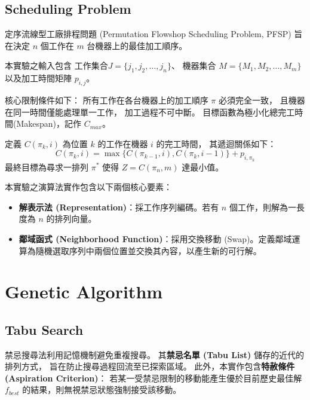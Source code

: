 \documentclass[conference]{IEEEtran}
\begin{document}
\subsection{Scheduling Problem}
定序流線型工廠排程問題 (Permutation Flowshop Scheduling Problem, PFSP)
旨在決定 $n$ 個工作在 $m$ 台機器上的最佳加工順序。

本實驗之輸入包含
工作集合$J = \{j_1, j_2, \dots, j_n\}$、
機器集合 $M = \{M_1, M_2, \dots, M_m\}$
以及加工時間矩陣 $p_{i,j}$。

核心限制條件如下：
所有工作在各台機器上的加工順序 $\pi$ 必須完全一致，
且機器在同一時間僅能處理單一工作，
加工過程不可中斷。
目標函數為極小化總完工時間(Makespan)，記作 $C_{max}$。

定義 $C(\pi_k, i)$ 為位置 $k$ 的工作在機器 $i$ 的完工時間，
其遞迴關係如下：
\begin{equation}
    C(\pi_k, i) = \max\{C(\pi_{k-1}, i), C(\pi_k, i-1)\} + p_{i,\pi_k}
\end{equation}
最終目標為尋求一排列 $\pi^*$ 使得 $Z = C(\pi_n, m)$ 達最小值。

本實驗之演算法實作包含以下兩個核心要素：
\begin{itemize}
    \setlength{\itemsep}{0pt}
    \item \textbf{解表示法 (Representation)}：採工作序列編碼。若有 $n$ 個工作，則解為一長度為 $n$ 的排列向量。
    \item \textbf{鄰域函式 (Neighborhood Function)}：採用交換移動 (Swap)。定義鄰域運算為隨機選取序列中兩個位置並交換其內容，以產生新的可行解。
\end{itemize}

\section{Genetic Algorithm}









\subsection{Tabu Search}
禁忌搜尋法利用記憶機制避免重複搜尋。
其\textbf{禁忌名單 (Tabu List)} 儲存的近代的排列方式，
旨在防止搜尋過程回流至已探索區域。
此外，本實作包含\textbf{特赦條件 (Aspiration Criterion)}：
若某一受禁忌限制的移動能產生優於目前歷史最佳解 $f_{best}$ 的結果，則無視禁忌狀態強制接受該移動。
\end{document}
